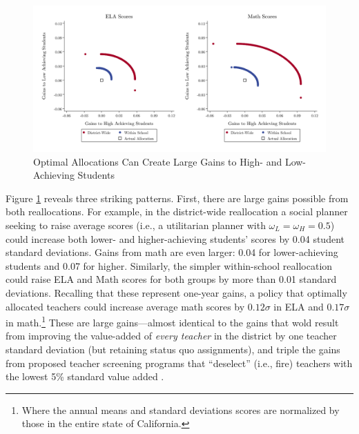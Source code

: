\documentclass[12pt]{article}
\theoremstyle{definition}
\theoremstyle{definition}
\theoremstyle{definition}
\theoremstyle{definition}
\begin{document}
\begin{figure}[htpb]
\centering
\includegraphics[width=.9\textwidth]{Working_Paper/test_figures/03_reallocation.pdf}
    \caption{Optimal Allocations Can Create Large Gains to High- and Low-Achieving Students}
    \label{fig:reallocation}
\end{figure}

Figure \ref{fig:reallocation} reveals three striking patterns. First, there are large gains possible from both reallocations. For example, in the district-wide reallocation a social planner seeking to raise average scores (i.e., a utilitarian planner with $\omega_L=\omega_H=0.5$) could increase both lower- and higher-achieving students' scores by 0.04 student standard deviations. Gains from math are even larger: 0.04 for lower-achieving students and 0.07 for higher. Similarly, the simpler within-school reallocation could raise ELA and Math scores for both groups by more than 0.01 standard deviations. Recalling that these represent one-year gains, a policy that optimally allocated teachers could increase average math scores by $0.12\sigma$ in ELA and $0.17\sigma$ in math.\footnote{Where the annual means and standard deviations scores are normalized by those in the entire state of California.} These are large gains---almost identical to the gains that wold result from improving the value-added of \textit{every teacher} in the district by one teacher standard deviation (but retaining status quo assignments), and triple the gains from proposed teacher screening programs that ``deselect'' (i.e., fire) teachers with the lowest 5\% standard value added \citep[as considered in][]{hanushek2009teacher,hanushek2011economic,chetty2014measuring2}.
\end{document}
